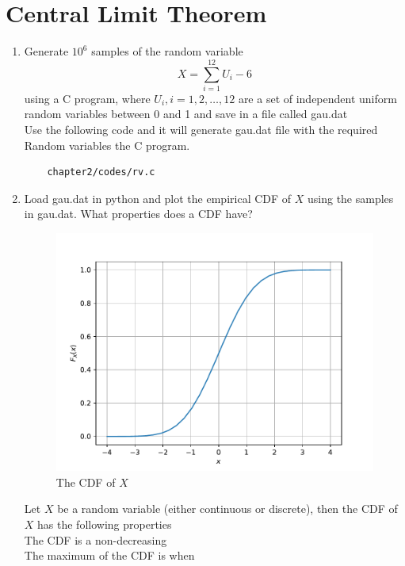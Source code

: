 \section{Central Limit Theorem}
\begin{enumerate}
\item
Generate $10^6$ samples of the random variable
%
\begin{equation}
X = \sum_{i=1}^{12}U_i -6
\end{equation}
%
using a C program, where $U_i, i = 1,2,\dots, 12$ are  a set of independent uniform random variables between 0 and 1
and save in a file called gau.dat\\
\solution Use the following code and it will generate gau.dat file with the required Random variables the  C program.
\begin{lstlisting}
	chapter2/codes/rv.c
\end{lstlisting}
%
\item
Load gau.dat in python and plot the empirical CDF of $X$ using the samples in gau.dat. What properties does a CDF have?
\\
\begin{figure}[h!]
\centering
\includegraphics[scale=0.8]{chapter2/figs/gauss_cdf.pdf}
\caption{The CDF of $X$}
\label{fig:gauss_cdf}
\end{figure}
Let $X$ be a random variable (either continuous or discrete), then the CDF
of $X$ has the following properties \\
The CDF is a non-decreasing \\
The maximum of the CDF is when
\begin{eqnarray}

\end{eqnarray}
\end{enumerate}
